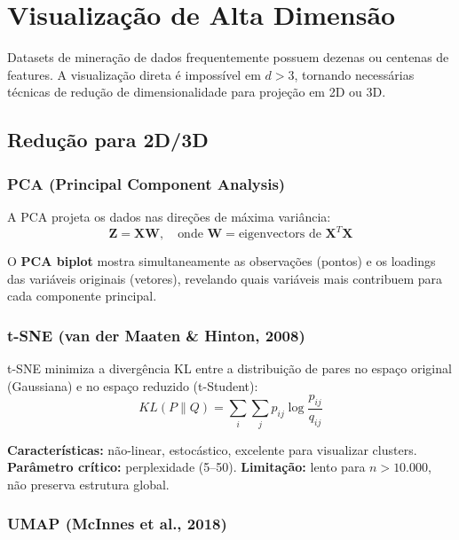 \documentclass[12pt,a4paper]{article}
\begin{document}
\section{Visualização de Alta Dimensão}

Datasets de mineração de dados frequentemente possuem dezenas ou centenas de features. A visualização direta é impossível em $d > 3$, tornando necessárias técnicas de redução de dimensionalidade para projeção em 2D ou 3D.

\subsection{Redução para 2D/3D}

\subsubsection{PCA (Principal Component Analysis)}

A PCA projeta os dados nas direções de máxima variância:
\begin{equation}
  \mathbf{Z} = \mathbf{X} \mathbf{W}, \quad \text{onde } \mathbf{W} = \text{eigenvectors de } \mathbf{X}^T\mathbf{X}
\end{equation}

O \textbf{PCA biplot} mostra simultaneamente as observações (pontos) e os loadings das variáveis originais (vetores), revelando quais variáveis mais contribuem para cada componente principal.

\subsubsection{t-SNE (van der Maaten \& Hinton, 2008)}

t-SNE minimiza a divergência KL entre a distribuição de pares no espaço original (Gaussiana) e no espaço reduzido (t-Student):
\begin{equation}
  KL(P \| Q) = \sum_i \sum_j p_{ij} \log \frac{p_{ij}}{q_{ij}}
\end{equation}

\textbf{Características:} não-linear, estocástico, excelente para visualizar clusters. \textbf{Parâmetro crítico:} perplexidade (5--50). \textbf{Limitação:} lento para $n > 10.000$, não preserva estrutura global.

\subsubsection{UMAP (McInnes et al., 2018)}
\end{document}
